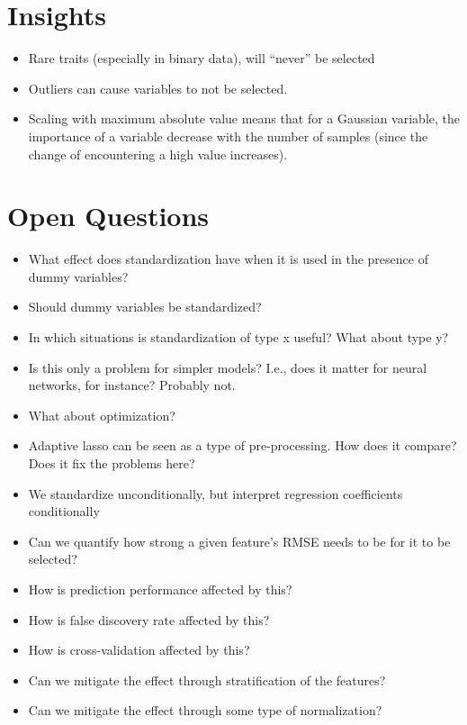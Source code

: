 \section{Insights}

\begin{itemize}
  \item Rare traits (especially in binary data), will ``never'' be selected
  \item Outliers can cause variables to not be selected.
  \item Scaling with maximum absolute value means that for a Gaussian variable, the importance of a variable decrease with the number of samples (since the change of encountering a high value increases).
\end{itemize}

\section{Open Questions}

\begin{itemize}
  \item What effect does standardization have when it is used in the presence of dummy variables?
  \item Should dummy variables be standardized?
  \item In which situations is standardization of type x useful? What about type y?
  \item Is this only a problem for simpler models? I.e., does it matter for neural networks, for instance? Probably not.
  \item What about optimization?
  \item Adaptive lasso can be seen as a type of pre-processing. How does it compare? Does it fix the problems here?
  \item We standardize unconditionally, but interpret regression coefficients conditionally
  \item Can we quantify how strong a given feature's RMSE needs to be for it to be selected?
  \item How is prediction performance affected by this?
  \item How is false discovery rate affected by this?
  \item How is cross-validation affected by this?
  \item Can we mitigate the effect through stratification of the features?
  \item Can we mitigate the effect through some type of normalization?
\end{itemize}




